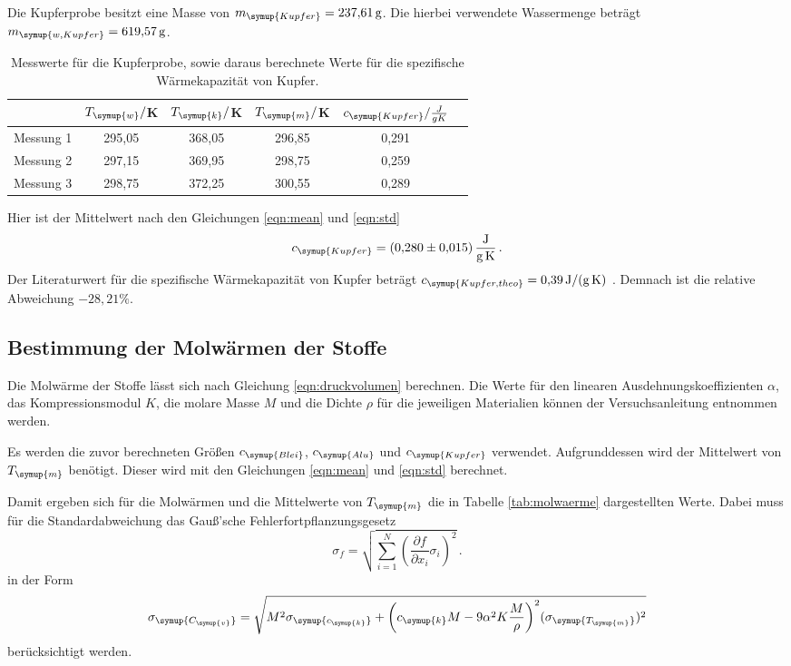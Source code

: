 Die Kupferprobe besitzt eine Masse von $m_{\symup{Kupfer}}=\SI{237.61}{\gram}$.
Die hierbei verwendete Wassermenge beträgt $m_{\symup{w,Kupfer}}=\SI{619.57}{\gram}$.

\begin{table}
  \centering
  \caption{Messwerte für die Kupferprobe, sowie daraus berechnete Werte für die spezifische
  Wärmekapazität von Kupfer.}
  \label{tab:kupfer}
  \begin{tabular}{c c c c c c}
    \toprule
    & $T_{\symup{w}}/$K & $T_{\symup{k}}/$K & $T_{\symup{m}}/$K & $c_{\symup{Kupfer}}/\frac{J}{g K}$ \\
    \midrule
    Messung 1 & 295,05 & 368,05 & 296,85 & 0,291 \\
    Messung 2 & 297,15 & 369,95 & 298,75 & 0,259 \\
    Messung 3 & 298,75 & 372,25 & 300,55 & 0,289 \\
    \bottomrule
  \end{tabular}
\end{table}

Hier ist der Mittelwert nach den Gleichungen \eqref{eqn:mean} und
\eqref{eqn:std}
\begin{equation}
  c_{\symup{Kupfer}} = \SI{0.280(0015)}{\joule\per\gram\per\kelvin} \,.\nonumber
\end{equation}
Der Literaturwert für die spezifische Wärmekapazität von Kupfer beträgt
$c_{\symup{Kupfer,theo}}=\SI{0.39}{\joule\per\gram\per\kelvin}$ \cite{werte}.
Demnach ist die relative Abweichung $-28,21\%$.


\subsection{Bestimmung der Molwärmen der Stoffe}
\label{sec:molwaerme}

Die Molwärme der Stoffe lässt sich nach Gleichung \eqref{eqn:druckvolumen}
berechnen. Die Werte für den linearen Ausdehnungskoeffizienten $\alpha$,
das Kompressionsmodul $K$, die molare Masse $M$ und die Dichte $\rho$
für die jeweiligen Materialien können der Versuchsanleitung \cite{Versuchsanleitung}
entnommen werden.

Es werden die zuvor berechneten Größen $c_{\symup{Blei}}$, $c_{\symup{Alu}}$
und $c_{\symup{Kupfer}}$ verwendet. Aufgrunddessen wird der Mittelwert von
$T_{\symup{m}}$ benötigt. Dieser wird mit den Gleichungen \eqref{eqn:mean} und
\eqref{eqn:std} berechnet.

Damit ergeben sich für die Molwärmen und die Mittelwerte von $T_{\symup{m}}$
die in Tabelle \ref{tab:molwaerme} dargestellten Werte.
Dabei muss für die Standardabweichung das Gauß'sche Fehlerfortpflanzungsgesetz
\begin{equation}
  \sigma_f = \sqrt{
    \sum\limits_{i = 1}^N
      \left( \frac{\partial f}{\partial x_i} \sigma_i \right)^{\!\! 2}
  }\,.
  \label{eqn:gaussfehler}
\end{equation}
in der Form
\begin{equation}
  \sigma_{\symup{C_{\symup{v}}}} = \sqrt{M^2\sigma_{\symup{c_{\symup{k}}}}
  +\biggl(c_{\symup{k}}M-9\alpha^2 K \frac{M}{\rho}\biggr)^2 (\sigma_{\symup{T_{\symup{m}}}})^2}
\end{equation}
berücksichtigt werden.


